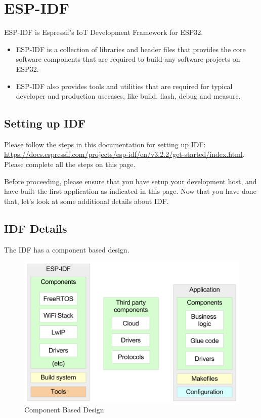 \documentclass[main.tex]{subfiles}
\begin{document}
\section{ESP-IDF}

ESP-IDF is Espressif's IoT Development Framework for ESP32. 
\begin{itemize}
    \item ESP-IDF is a collection of libraries and header files that provides the core software components that are required to build any software projects on ESP32. 
    \item ESP-IDF also provides tools and utilities that are required for typical developer and production usecases, like build, flash, debug and measure.
\end{itemize}

\subsection{Setting up IDF}

Please follow the steps in this documentation for setting up IDF: \url{https://docs.espressif.com/projects/esp-idf/en/v3.2.2/get-started/index.html}. Please complete all the steps on this page.

Before proceeding, please ensure that you have setup your development host, and have built the first application as indicated in this page. Now that you have done that, let's look at some additional details about IDF.

\subsection{IDF Details}

The IDF has a component based design.

\begin{figure}[h!]
    \centering
    \includegraphics[width=\textwidth]{../../_static/idf_comp.png}
    \caption{Component Based Design}
    \label{fig:idf_comp_design}
\end{figure}
\end{document}
